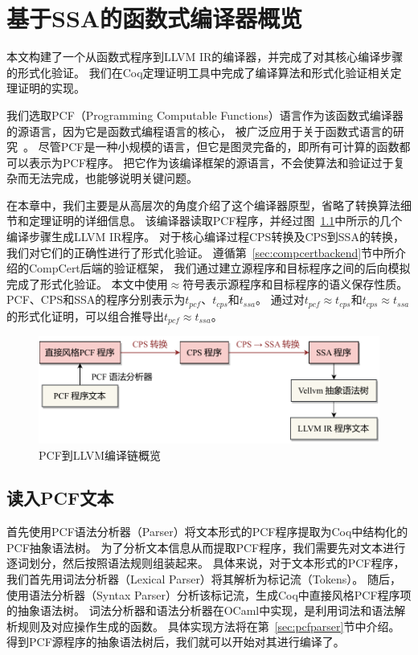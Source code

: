 
\chapter{基于SSA的函数式编译器概览} \label{sec:overview}

本文构建了一个从函数式程序到LLVM IR的编译器，并完成了对其核心编译步骤的形式化验证。
我们在Coq定理证明工具中完成了编译算法和形式化验证相关定理证明的实现。

我们选取PCF（Programming Computable Functions）语言作为该函数式编译器的源语言，因为它是函数式编程语言的核心，
被广泛应用于关于函数式语言的研究~\cite{plotkin1977lcf,ABRAMSKY2000409}。
尽管PCF是一种小规模的语言，但它是图灵完备的，即所有可计算的函数都可以表示为PCF程序。
把它作为该编译框架的源语言，不会使算法和验证过于复杂而无法完成，也能够说明关键问题。

在本章中，我们主要是从高层次的角度介绍了这个编译器原型，省略了转换算法细节和定理证明的详细信息。
该编译器读取PCF程序，并经过图~\ref{overview}中所示的几个编译步骤生成LLVM IR程序。
对于核心编译过程CPS转换及CPS到SSA的转换，我们对它们的正确性进行了形式化验证。
遵循第~\ref{sec:compcertbackend}节中所介绍的CompCert后端的验证框架，
我们通过建立源程序和目标程序之间的后向模拟完成了形式化验证。
本文中使用$\approx $符号表示源程序和目标程序的语义保存性质。
PCF、CPS和SSA的程序分别表示为$t_{pcf}$、$t_{cps}$和$t_{ssa}$。
通过对$t_{pcf}\approx t_{cps}$和$t_{cps}\approx t_{ssa}$的形式化证明，可以组合推导出$t_{pcf}\approx t_{ssa}$。

\begin{figure}[htbp]
    \centering
    \vspace{2ex}
    \includegraphics[width=0.8\linewidth]{figures/overview.pdf}
    \caption{PCF到LLVM编译链概览}\label{overview}
\end{figure}

\section{读入PCF文本}

首先使用PCF语法分析器（Parser）将文本形式的PCF程序提取为Coq中结构化的PCF抽象语法树。
为了分析文本信息从而提取PCF程序，我们需要先对文本进行逐词划分，然后按照语法规则组装起来。
具体来说，对于文本形式的PCF程序，
我们首先用词法分析器（Lexical Parser）将其解析为标记流（Tokens）。
随后，使用语法分析器（Syntax Parser）分析该标记流，生成Coq中直接风格PCF程序项的抽象语法树。
词法分析器和语法分析器在OCaml中实现，是利用词法和语法解析规则及对应操作生成的函数。
具体实现方法将在第~\ref{sec:pcfparser}节中介绍。
得到PCF源程序的抽象语法树后，我们就可以开始对其进行编译了。


